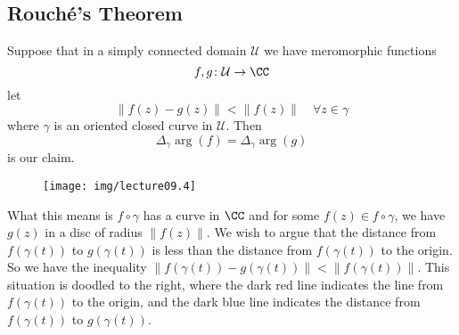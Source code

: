 \subsection{Rouch\'e's Theorem}

Suppose that in a simply connected domain $\mathcal{U}$ we have
meromorphic functions
\begin{equation}
f,g\colon\mathcal{U}\to\CC
\end{equation}
let
\begin{equation}
\|f(z)-g(z)\|<\|f(z)\|\quad\forall z\in\gamma
\end{equation}
where $\gamma$ is an oriented closed curve in $\mathcal{U}$. Then
\begin{equation}
\Delta_{\gamma}\arg(f)=\Delta_{\gamma}\arg(g)
\end{equation}
is our claim.

\begin{wrapfigure}[12]{r}{2.8in}
\vspace{-30pt}
\begin{center}
\texttt{[image: img/lecture09.4]}
\end{center}
\vspace{-20pt}
\end{wrapfigure}
What this means is $f\circ\gamma$ has a curve in $\CC$ and for
some $f(z)\in f\circ\gamma$, we have $g(z)$ in a disc of radius
$\|f(z)\|$. We wish to argue that the distance from
$f(\gamma(t))$ to $g(\gamma(t))$ is less than the distance from
$f(\gamma(t))$ to the origin. So we have the inequality
$\|f(\gamma(t))-g(\gamma(t))\|<\|f(\gamma(t))\|$. This situation
is doodled to the right, where the dark red line indicates the
line from $f(\gamma(t))$ to the origin, and the dark blue line
indicates the distance from $f(\gamma(t))$ to $g(\gamma(t))$.

